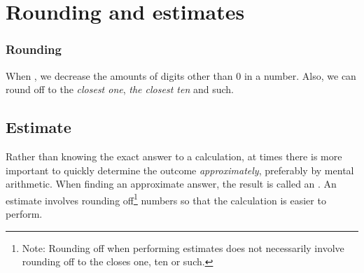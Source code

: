 \section{Rounding and estimates}

\subsubsection{Rounding}
When , we decrease the amounts of digits other than 0 in a number. Also, we can round off to the \textsl{closest one}, \textsl{the closest ten} and such.\regv
{}


\subsection{Estimate}
Rather than knowing the exact answer to a calculation, at times there is more important to quickly determine the outcome \textsl{approximately}, preferably by mental arithmetic. When finding an approximate answer, the result is called an . An estimate involves rounding off\footnote{Note: Rounding off when performing estimates does not necessarily involve rounding off to the closes one, ten or such.} numbers so that the calculation is easier to perform. \regv

